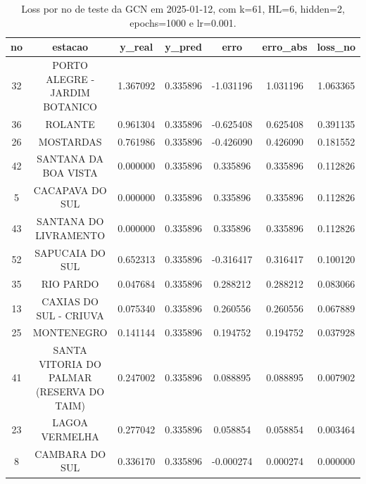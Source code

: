 \begin{table}[h]
\centering
\caption{Loss por no de teste da GCN em 2025-01-12, com k=61, HL=6, hidden=2, epochs=1000 e lr=0.001.}
\label{tab:gcn_loss_k61_hl6_h2_e1000_d20250112}
\begin{tabular}{ccccccc}
\toprule
no & estacao & y\_real & y\_pred & erro & erro\_abs & loss\_no \\
\midrule
32 & PORTO ALEGRE - JARDIM BOTANICO & 1.367092 & 0.335896 & -1.031196 & 1.031196 & 1.063365 \\
36 & ROLANTE & 0.961304 & 0.335896 & -0.625408 & 0.625408 & 0.391135 \\
26 & MOSTARDAS & 0.761986 & 0.335896 & -0.426090 & 0.426090 & 0.181552 \\
42 & SANTANA DA BOA VISTA & 0.000000 & 0.335896 & 0.335896 & 0.335896 & 0.112826 \\
5 & CACAPAVA DO SUL & 0.000000 & 0.335896 & 0.335896 & 0.335896 & 0.112826 \\
43 & SANTANA DO LIVRAMENTO & 0.000000 & 0.335896 & 0.335896 & 0.335896 & 0.112826 \\
52 & SAPUCAIA DO SUL & 0.652313 & 0.335896 & -0.316417 & 0.316417 & 0.100120 \\
35 & RIO PARDO & 0.047684 & 0.335896 & 0.288212 & 0.288212 & 0.083066 \\
13 & CAXIAS DO SUL - CRIUVA & 0.075340 & 0.335896 & 0.260556 & 0.260556 & 0.067889 \\
25 & MONTENEGRO & 0.141144 & 0.335896 & 0.194752 & 0.194752 & 0.037928 \\
41 & SANTA VITORIA DO PALMAR (RESERVA DO TAIM) & 0.247002 & 0.335896 & 0.088895 & 0.088895 & 0.007902 \\
23 & LAGOA VERMELHA & 0.277042 & 0.335896 & 0.058854 & 0.058854 & 0.003464 \\
8 & CAMBARA DO SUL & 0.336170 & 0.335896 & -0.000274 & 0.000274 & 0.000000 \\
\bottomrule
\end{tabular}
\end{table}
